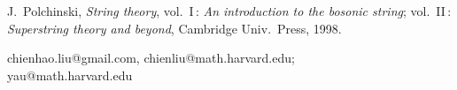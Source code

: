 \documentclass[11pt]{article}
\numberwithin{equation}{subsection}
\begin{document}
{\begin{thebibliography}{AAaaaa}
\bibitem[Po]{} J.~Polchinski,
 {\sl String theory},
 vol.\ I$\,$: {\sl An introduction to the bosonic string};
 vol.\ II$\,$: {\sl Superstring theory and beyond},
 Cambridge Univ.\ Press, 1998.


\end{thebibliography}

\vspace{1em}

\noindent
chienhao.liu@gmail.com, chienliu@math.harvard.edu; \\
yau@math.harvard.edu


}%
\end{document}
